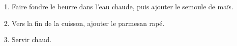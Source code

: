 
\begin{ingredients}
\end{ingredients}


\begin{recipe}
  \begin{enumerate}

  \item Faire fondre le beurre dans l'eau chaude, puis ajouter le
    semoule de maïs.

  \item Vers la fin de la cuisson, ajouter le parmesan rapé.

  \item Servir chaud.

  \end{enumerate}
\end{recipe}

